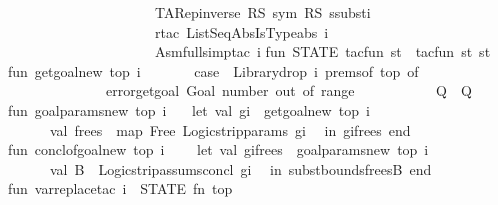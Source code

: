\begin{isabellebody}
\ \ \ \ \ \ \ \ \ \ \ \ \ \ \ \ \ \ \ \ \ {\isacharparenleft}TARep{\isacharunderscore}inverse\ RS\ sym\ RS\ ssubst{\isacharparenright}i{\isacharparenright}{\isacharcomma}\isanewline
\ \ \ \ \ \ \ \ \ \ \ \ \ \ \ \ \ \ \ \ \ {\isacharparenleft}rtac\ ListSeqAbsIsTypeabs\ i{\isacharparenright}{\isacharcomma}\ \isanewline
\ \ \ \ \ \ \ \ \ \ \ \ \ \ \ \ \ \ \ \ \ {\isacharparenleft}Asm{\isacharunderscore}full{\isacharunderscore}simp{\isacharunderscore}tac\ i{\isacharparenright}{\isacharbrackright}{\isacharparenright}{\isacharparenright}\isanewline
\isanewline
{\isacharverbatimclose}\isanewline
\isanewline
\isanewline
{}\isamarkupfalse%
\isanewline
{\isacharverbatimopen}\isanewline
fun\ STATE\ tacfun\ st\ {\isacharequal}\ tacfun\ st\ st{\isacharsemicolon}\isanewline
\isanewline
fun\ getgoal{\isacharunderscore}new\ top\ i\ {\isacharequal}\isanewline
\ \ \ \ \ \ {\isacharparenleft}case\ \ Library{\isachardot}drop\ {\isacharparenleft}i{\isacharminus}{}{\isacharcomma}\ prems{\isacharunderscore}of\ top{\isacharparenright}\ of\isanewline
\ \ \ \ \ \ \ \ \ \ \ \ {\isacharbrackleft}{\isacharbrackright}\ {\isacharequal}{\isachargreater}\ error{\isachardoublequote}getgoal{\isacharcolon}\ Goal\ number\ out\ of\ range{\isachardoublequote}\isanewline
\ \ \ \ \ \ \ \ \ \ {\isacharbar}\ Q{\isacharcolon}{\isacharcolon}{\isacharunderscore}\ {\isacharequal}{\isachargreater}\ Q{\isacharparenright}{\isacharsemicolon}\isanewline
\isanewline
fun\ goal{\isacharunderscore}params{\isacharunderscore}new\ top\ i\ {\isacharequal}\isanewline
\ \ let\ val\ gi\ {\isacharequal}\ getgoal{\isacharunderscore}new\ top\ i\isanewline
\ \ \ \ \ \ val\ frees\ {\isacharequal}\ map\ Free\ {\isacharparenleft}Logic{\isachardot}strip{\isacharunderscore}params\ gi{\isacharparenright}\isanewline
\ \ in\ {\isacharparenleft}gi{\isacharcomma}frees{\isacharparenright}\ end{\isacharsemicolon}\isanewline
\isanewline
fun\ concl{\isacharunderscore}of{\isacharunderscore}goal{\isacharunderscore}new\ top\ i\ {\isacharequal}\ \isanewline
\ \ let\ val\ {\isacharparenleft}gi{\isacharcomma}frees{\isacharparenright}\ {\isacharequal}\ goal{\isacharunderscore}params{\isacharunderscore}new\ top\ i\isanewline
\ \ \ \ \ \ val\ B\ {\isacharequal}\ Logic{\isachardot}strip{\isacharunderscore}assums{\isacharunderscore}concl\ gi\isanewline
\ \ in\ subst{\isacharunderscore}bounds{\isacharparenleft}frees{\isacharcomma}B{\isacharparenright}\ end{\isacharsemicolon}\isanewline
{\isacharverbatimclose}\isanewline
\isanewline
{}\isamarkupfalse%
\ \isanewline
{\isacharverbatimopen}\isanewline
fun\ var{\isacharunderscore}replace{\isacharunderscore}tac\ i\ {\isacharequal}\ {\isacharparenleft}STATE\ {\isacharparenleft}fn\ top\ {\isacharequal}{\isachargreater}\ \isanewline

\end{isabellebody}
